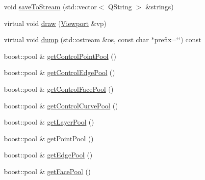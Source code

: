\begin{DoxyCompactItemize}
\item 
void \hyperlink{classShipCAD_1_1SubdivisionSurface_a51d2d07423cc53fc98012f07ed9525bc}{save\-To\-Stream} (std\-::vector$<$ Q\-String $>$ \&strings)
\item 
virtual void \hyperlink{classShipCAD_1_1SubdivisionSurface_acfe9cc964dbe05105486b43f2dc6fc4f}{draw} (\hyperlink{classShipCAD_1_1Viewport}{Viewport} \&vp)
\item 
virtual void \hyperlink{classShipCAD_1_1SubdivisionSurface_a6ed961bbb7ca5fe94ec5566109d9b015}{dump} (std\-::ostream \&os, const char $\ast$prefix=\char`\"{}\char`\"{}) const 
\item 
boost\-::pool \& \hyperlink{classShipCAD_1_1SubdivisionSurface_a49109b80a26f29ad52ac109574cf4d5a}{get\-Control\-Point\-Pool} ()
\item 
boost\-::pool \& \hyperlink{classShipCAD_1_1SubdivisionSurface_aa9ed4c00847b5c04f99b27f754df481b}{get\-Control\-Edge\-Pool} ()
\item 
boost\-::pool \& \hyperlink{classShipCAD_1_1SubdivisionSurface_ab9199097e998971add79f7dccbd262c3}{get\-Control\-Face\-Pool} ()
\item 
boost\-::pool \& \hyperlink{classShipCAD_1_1SubdivisionSurface_a647c0e4a20cfd823cc578431c2799c04}{get\-Control\-Curve\-Pool} ()
\item 
boost\-::pool \& \hyperlink{classShipCAD_1_1SubdivisionSurface_a7e80bac4f91557a620fc1843f77b9953}{get\-Layer\-Pool} ()
\item 
boost\-::pool \& \hyperlink{classShipCAD_1_1SubdivisionSurface_a8a8dbbc32fcdc5a08c462cd86c224649}{get\-Point\-Pool} ()
\item 
boost\-::pool \& \hyperlink{classShipCAD_1_1SubdivisionSurface_a2bffb2bf9575d934e18ed5087f8d2996}{get\-Edge\-Pool} ()
\item 
boost\-::pool \& \hyperlink{classShipCAD_1_1SubdivisionSurface_a3fcdae8e54e98938de00dfa4229d8aa8}{get\-Face\-Pool} ()
\end{DoxyCompactItemize}
